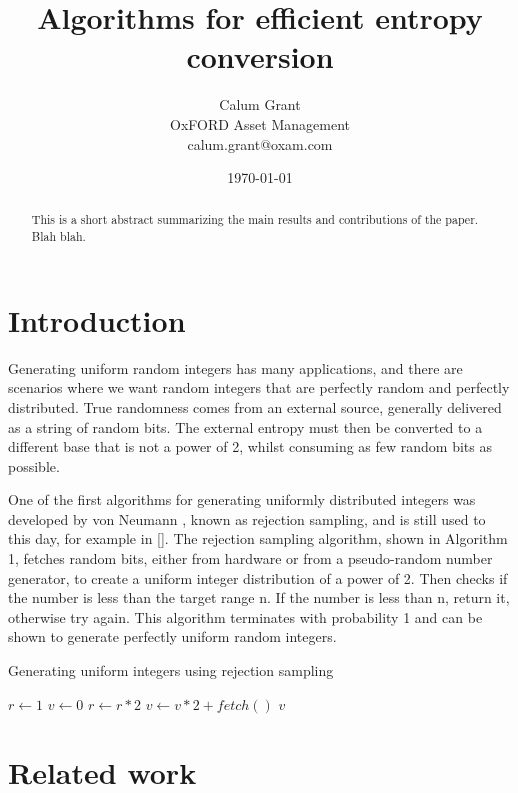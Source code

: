 \documentclass[12pt]{article}
\title{Algorithms for efficient entropy conversion}
\author{Calum Grant \\
OxFORD Asset Management \\
calum.grant@oxam.com}
\date{\today}
\begin{document}
\maketitle

\begin{abstract}
This is a short abstract summarizing the main results and contributions of the paper. Blah blah.
\end{abstract}

\section{Introduction}

Generating uniform random integers has many applications, and there are scenarios where we want random integers that are perfectly random and perfectly distributed. True randomness comes from an external source, generally delivered as a string of random bits. The external entropy must then be converted to a different base that is not a power of 2, whilst consuming as few random bits as possible.

One of the first algorithms for generating uniformly distributed integers was developed by von Neumann \cite{neumann}, known as rejection sampling, and is still used to this day, for example in []. The rejection sampling algorithm, shown in Algorithm 1, fetches random bits, either from hardware or from a pseudo-random number generator, to create a uniform integer distribution of a power of 2. Then checks if the number is less than the target range n. If the number is less than n, return it, otherwise try again. This algorithm terminates with probability 1 and can be shown to generate perfectly uniform random integers.

\begin{algorithm}
\caption{Generating uniform integers using rejection sampling}
\begin{algorithmic}[1]
        \State $r \gets 1$
        \State $v \gets 0$
            \State $r \gets r * 2$
            \State $v \gets v * 2 + fetch()$
        \EndWhile
            \State \Return $v$
        \EndIf
    \EndWhile
\EndProcedure
\end{algorithmic}
\end{algorithm}

\section{Related work}
\end{document}
